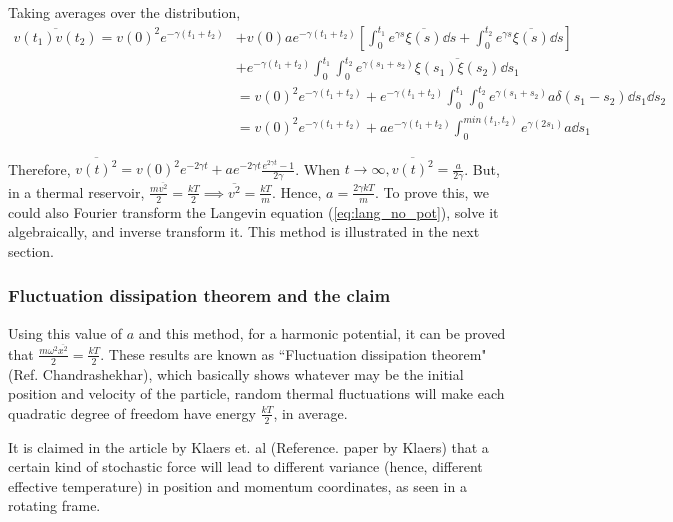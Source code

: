 \documentclass[12pt, twoside]{article}
\begin{document}
Taking averages over the distribution,\\
$\begin{aligned}\overline{v(t_1) v(t_2)} = v(0)^2 e^{-\gamma(t_1 + t_2)} &+ v(0) a e^{-\gamma(t_1 + t_2)} \left[\int_{0}^{t_1} e^{\gamma s} \overline{\xi(s)} \dd{s} + \int_{0}^{t_2} e^{\gamma s} \overline{\xi(s)} \dd{s}\right] \\&+ e^{-\gamma(t_1 + t_2)} \int_{0}^{t_1}\int_{0}^{t_2} e^{\gamma(s_1 + s_2)} \overline{\xi(s_1)\xi(s_2)} \dd{s_1} \\ &= v(0)^2 e^{-\gamma(t_1 + t_2)} + e^{-\gamma(t_1 + t_2)} \int_{0}^{t_1}\int_{0}^{t_2} e^{\gamma(s_1 + s_2)} {a} \delta(s_1 - s_2) \dd{s_1} \dd{s_2} \\ &= v(0)^2 e^{-\gamma(t_1 + t_2)} + a  e^{-\gamma(t_1 + t_2)} \int_{0}^{min(t_1,t_2)} e^{\gamma(2 s_1)} {a} \dd{s_1} \end{aligned}$

Therefore, $\overline{v(t)^2} = v(0)^2 e^{-2\gamma t} + a e^{-2\gamma t}\frac{e^{2\gamma t} - 1}{2\gamma}$. When $t \rightarrow \infty, \overline{v(t)^2} = \frac{a}{2\gamma}$. But, in a thermal reservoir, $\frac{m\overline{v^2}}{2} =\frac{k T}{2} \implies \overline{v^2} = \frac{kT}{m}$. Hence, $a = \frac{2 \gamma k T}{m}$. To prove this, we could also Fourier transform the Langevin equation (\ref{eq:lang_no_pot}), solve it algebraically, and inverse transform it. This method is illustrated in the next section.
\subsubsection{Fluctuation dissipation theorem and the claim}
Using this value of $a$ and this method, for a harmonic potential, it can be proved that $\frac{m \omega^2 \overline{x^2}}{2} = \frac{k T}{2}$. These results are known as ``Fluctuation dissipation theorem" (Ref. Chandrashekhar), which basically shows whatever may be the initial position and velocity of the particle, random thermal fluctuations will make each quadratic degree of freedom have energy $\frac{kT}{2}$, in average.

It is claimed in the article by Klaers et. al (Reference. paper by Klaers) that a certain kind of stochastic force will lead to different variance (hence, different effective temperature) in position and momentum coordinates, as seen in a rotating frame.
\end{document}
